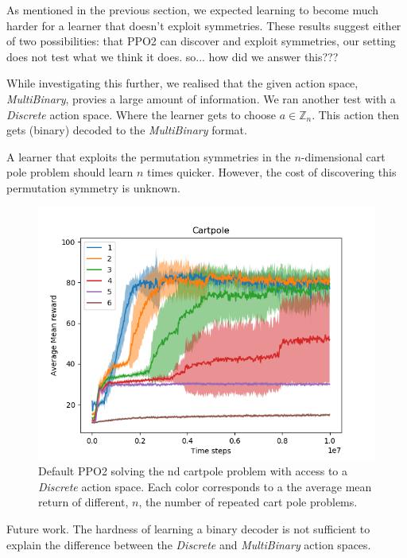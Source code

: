As mentioned in the previous section, we expected learning to become much
harder for a learner that doesn't exploit symmetries. These results suggest either of two possibilities:
that PPO2 can discover and exploit symmetries, our setting does not test what we think it does. {\color{red}so... how did we answer this???}

While investigating this further, we realised that the given action space, \textit{MultiBinary}, provies a large amount of information. We ran another test with a \textit{Discrete} action space. Where the learner gets to choose $a\in \mathbb Z_n$.
This action then gets (binary) decoded to the \textit{MultiBinary} format.

A learner that exploits the permutation symmetries in the $n$-dimensional cart pole problem should learn $n$ times quicker.
However, the cost of discovering this permutation symmetry is unknown.

\begin{figure}[h!]
\centering
\includegraphics[width=1\textwidth,height=0.5\textheight]{../../pictures/figures/discrete-nd-cart.png}
\caption{Default PPO2 solving the nd cartpole problem with access to a \textit{Discrete} action space. Each color corresponds to a the average mean return of different, $n$, the number of repeated cart pole problems.}
\end{figure}






Future work. The hardness of learning a binary decoder is not sufficient to explain the difference between the
\textit{Discrete} and \textit{MultiBinary} action spaces.

